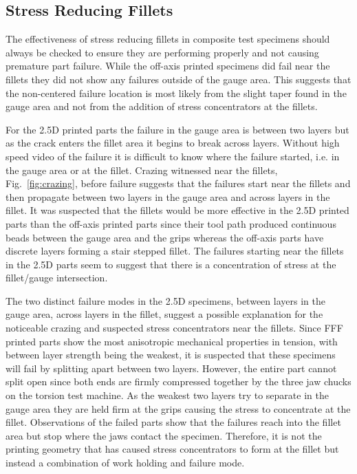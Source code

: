 \documentclass[main.tex]{subfiles}
\begin{document}
\subsection{Stress Reducing Fillets}
The effectiveness of stress reducing fillets in composite test specimens should always be checked to ensure they are performing properly and not causing premature part failure.
While the off-axis printed specimens did fail near the fillets they did not show any failures outside of the gauge area.
This suggests that the non-centered failure location is most likely from the slight taper found in the gauge area and not from the addition of stress concentrators at the fillets.

For the 2.5D printed parts the failure in the gauge area is between two layers but as the crack enters the fillet area it begins to break across layers.
Without high speed video of the failure it is difficult to know where the failure started, i.e. in the gauge area or at the fillet. Crazing witnessed near the fillets, Fig.~\ref{fig:crazing}, before failure suggests that the failures start near the fillets and then propagate between two layers in the gauge area and across layers in the fillet.
It was suspected that the fillets would be more effective in the 2.5D printed parts than the off-axis printed parts since their tool path produced continuous beads between the gauge area and the grips whereas the off-axis parts have discrete layers forming a stair stepped fillet.
The failures starting near the fillets in the 2.5D parts seem to suggest that there is a concentration of stress at the fillet/gauge intersection.

The two distinct failure modes in the 2.5D specimens, between layers in the gauge area, across layers in the fillet, suggest a possible explanation for the noticeable crazing and suspected stress concentrators near the fillets.
Since FFF printed parts show the most anisotropic mechanical properties in tension, with between layer strength being the weakest, it is suspected that these specimens will fail by splitting apart between two layers.
However, the entire part cannot split open since both ends are firmly compressed together by the three jaw chucks on the torsion test machine.
As the weakest two layers try to separate in the gauge area they are held firm at the grips causing the stress to concentrate at the fillet.
Observations of the failed parts show that the failures reach into the fillet area but stop where the jaws contact the specimen.
Therefore, it is not the printing geometry that has caused stress concentrators to form at the fillet but instead a combination of work holding and failure mode.
\end{document}
